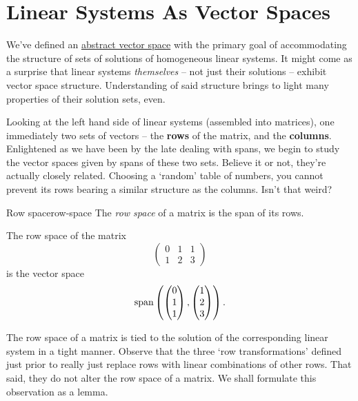 \section{Linear Systems As Vector Spaces}
\label{sec:linear-systems-as-vector-spaces}

We've defined an \hyperref[def:abstract-vector-space]{abstract vector space}
with the primary goal of accommodating the structure of sets of solutions of
homogeneous linear systems. It might come as a surprise that linear systems
\emph{themselves} -- not just their solutions -- exhibit vector space structure.
Understanding of said structure brings to light many properties of their
solution sets, even.

Looking at the left hand side of linear systems (assembled into matrices), one
immediately two sets of vectors -- the \textbf{rows} of the matrix, and the
\textbf{columns}. Enlightened as we have been by the late
 dealing with spans, we begin to study
the vector spaces given by spans of these two sets. Believe it or not, they're
actually closely related. Choosing a `random' table of numbers, you cannot
prevent its rows bearing a similar structure as the columns. Isn't that weird?

\begin{definition}{Row space}{row-space}
 The \emph{row space} of a matrix is the span of its rows.
\end{definition}

\begin{example}{}{}
 The row space of the matrix
 \[
  \begin{pmatrix}
   0 & 1 & 1\\
   1 & 2 & 3
  \end{pmatrix}
 \]
 is the vector space
 \[
  \operatorname{span} \left( 
  \begin{pmatrix}
   0\\
   1\\
   1
  \end{pmatrix},
  \begin{pmatrix}
   1\\
   2\\
   3
  \end{pmatrix}
 \right).
 \]
\end{example}

The row space of a matrix is tied to the solution of the corresponding linear
system in a tight manner. Observe that the three `row transformations' defined
just prior to  really just replace rows with
linear combinations of other rows. That said, they do not alter the row space of
a matrix. We shall formulate this observation as a lemma.

